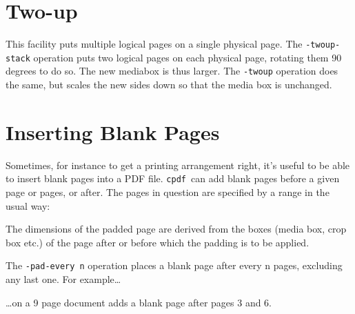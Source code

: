 \documentclass{book}
\newcommand{\cpdf}{\texttt{cpdf}}
\begin{document}
  \section{Two-up}
    This facility puts multiple logical pages on a single physical page.  The \texttt{-twoup-stack} operation puts two logical pages on each physical
page, rotating them 90 degrees to do so. The new mediabox is thus larger. The \texttt{-twoup} operation does the same, but scales the new sides down so
that the media box is unchanged.


  \section{Inserting Blank Pages}
  Sometimes, for instance to get a printing arrangement right, it's useful to
be able to insert blank pages into a PDF file. \cpdf\ can add blank pages
before a given page or pages, or after. The pages in question are specified by
a range in the usual way:

\noindent{}

  \noindent The dimensions of the padded page are derived from the boxes (media box, crop box etc.) of the page after or before which the padding is to be applied.

  The \verb!-pad-every n! operation places a blank page after every n pages, excluding any last one. For example\ldots

\noindent{}

  \noindent\ldots on a 9 page document adds a blank page after pages 3 and 6.
\end{document}
